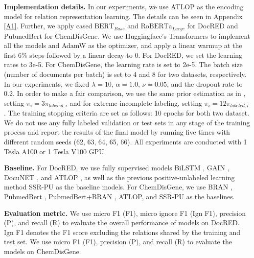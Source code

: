 \documentclass[11pt]{article}
\begin{document}
\textbf{Implementation details.} \enspace In our experiments, we use ATLOP \citep{Zhou_Huang_Ma_Huang_2021} as the encoding model for relation representation learning. The details can be seen in Appendix \ref{A1}. Further, we apply cased $\mathrm{BERT}_{Base}$ \citep{devlin-etal-2019-bert} and $\mathrm{RoBERTa}_{Large}$ \citep{liu2019roberta} for DocRED and $\mathrm{PubmedBert}$ \citep{10.1145/3458754} for ChemDisGene. We use Huggingface's Transformers \citep{wolf-etal-2020-transformers} to implement all the models and AdamW \citep{loshchilov2018decoupled} as the optimizer, and apply a linear warmup \citep{goyal2017accurate} at the first 6\% steps followed by a linear decay to 0. For DocRED, we set the learning rates to 3e-5. For ChemDisGene, the learning rate is set to 2e-5. The batch size (number of documents per batch) is set to 4 and 8 for two datasets, respectively. In our experiments, we fixed $\lambda=10$, $\alpha=1.0$, $\nu=0.05$, and the dropout rate to 0.2. In order to make a fair comparison, we use the same prior estimation as in \citep{wang2022unified}, setting $\pi_{i}=3\pi_{labeled,i}$ and for extreme incomplete labeling, setting $\pi_{i}=12\pi_{labeled,i}$. The training stopping criteria are set as follows: 10 epochs for both two dataset. We do not use any fully labeled validation or test sets in any stage of the training process and report the results of the final model by running five times with different random seeds (62, 63, 64, 65, 66). All experiments are conducted with 1 Tesla A100 or 1 Tesla V100 GPU.

\textbf{Baseline.} \enspace For DocRED, we use fully supervised models BiLSTM \citep{yao-etal-2019-docred}, GAIN \citep{zeng-etal-2020-double}, DocuNET \citep{ijcai2021p551}, and ATLOP \citep{Zhou_Huang_Ma_Huang_2021}, as well as the previous positive-unlabeled learning method SSR-PU \citep{wang2022unified} as the baseline models. For ChemDisGene, we use BRAN \citep{verga-etal-2018-simultaneously}, PubmedBert \citep{10.1145/3458754}, PubmedBert+BRAN \citep{zhang-etal-2022-distant}, ATLOP, and SSR-PU as the baselines.

\textbf{Evaluation metric.} \enspace We use micro F1 (F1), micro ignore F1 (Ign F1), precision (P), and recall (R) to evaluate the overall performance of models on DocRED. Ign F1 denotes the F1 score excluding the relations shared by the training and test set. We use micro F1 (F1), precision (P), and recall (R) to evaluate the models on ChemDisGene.
\end{document}
